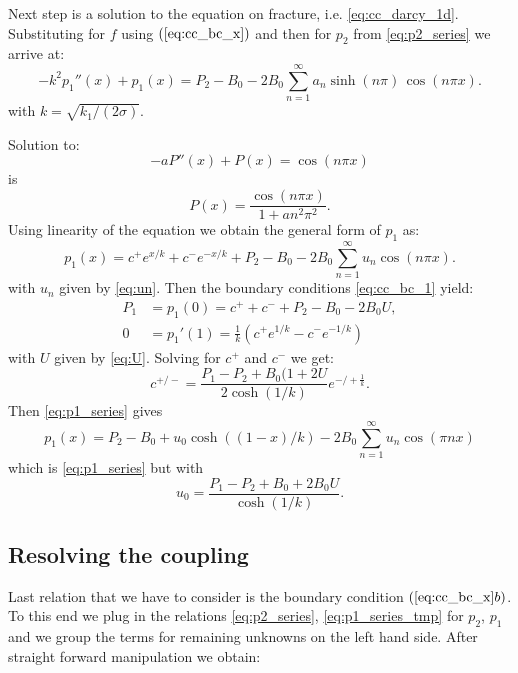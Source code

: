 \documentclass[a4paper,10pt]{article}
\begin{document}
 Next step is a solution to the equation on fracture, i.e. \eqref{eq:cc_darcy_1d}. 
 Substituting for $f$ using $(\ref{eq:cc_bc_x})$ and then for $p_2$ from \eqref{eq:p2_series}
 we arrive at: 
\begin{equation}
    \label{eq:p1_equation}
    -k^2 p_1''(x) + p_1 (x) = P_2 - B_0 - 2 B_0 \sum ^{\infty}_{n=1} a_n \sinh(n\pi)\, \cos (n\pi x).
\end{equation}
with $k = \sqrt{k_1 / (2 \sigma)}$.

Solution to:
\[
    - a P''(x) + P(x) = \cos(n \pi x) 
\]    
is 
\[
    P(x) = \frac{\cos(n \pi x)}{1+an^2\pi^2}.
\]
Using linearity of the equation we obtain the general form of $p_1$ as:
\begin {equation}
    \label{eq:p1_series}        
    p_1(x) = c^+ e^{x/k} + c^- e^{-x/k} + P_2 - B_0 
    - 2 B_0 \sum^{\infty}_{n=1} u_n \cos (n\pi x).
\end {equation}
with $u_n$ given by \eqref{eq:un}. Then the boundary conditions \eqref{eq:cc_bc_1} yield:
\begin{align*}
P_1 &= p_1(0) = c^+ + c^- + P_2 - B_0 - 2 B_0 U, \\
0 &= p_1'(1) = \frac{1}{k}(c^+e^{1/k} - c^- e^{-1/k}) 
\end{align*}
with $U$ given by \eqref{eq:U}. Solving for $c^+$ and $c^-$ we get:
\[
  c^{+/-} = \frac{P_1 - P_2 + B_0(1 + 2 U}{2\cosh(1/k)} e^{-/+\frac{1}{k}}.
\]
Then \eqref{eq:p1_series} gives 
\begin{equation}
    \label{eq:p1_series_tmp}
    p_1(x) = P_2 -  B_0 + u_0 \cosh((1-x)/k) - 2B_0 \sum_{n=1}^\infty  u_n \cos(\pi n x) 
\end{equation}
which is \eqref{eq:p1_series} but with 
\begin{equation}
    \label{eq:u0_def}    
    u_0 = \frac{P_1 - P_2 + B_0 + 2 B_0 U}{\cosh(1/k)}.
\end{equation}



\subsection{Resolving the coupling}
\label{sec:cont_coupling}

Last relation that we have to consider is the boundary condition $(\ref{eq:cc_bc_x}b)$. To this end we plug in the relations \eqref{eq:p2_series}, 
\eqref{eq:p1_series_tmp} for $p_2$, $p_1$  and we group the terms for remaining unknowns on the left hand side. After straight forward
manipulation we obtain:
\end{document}
